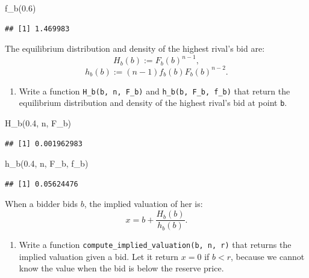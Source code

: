 \documentclass[
]{book}
\newenvironment{Shaded}{\begin{snugshade}}{\end{snugshade}}
\newcommand{\FloatTok}[1]{\textcolor[rgb]{0.00,0.00,0.81}{#1}}
\newcommand{\FunctionTok}[1]{\textcolor[rgb]{0.00,0.00,0.00}{#1}}
\newcommand{\NormalTok}[1]{#1}
\providecommand{\tightlist}{%
  \setlength{\itemsep}{0pt}\setlength{\parskip}{0pt}}
\begin{document}
\begin{Shaded}
\begin{Highlighting}[]
\FunctionTok{f\_b}\NormalTok{(}\FloatTok{0.6}\NormalTok{)}
\end{Highlighting}
\end{Shaded}

\begin{verbatim}
## [1] 1.469983
\end{verbatim}

The equilibrium distribution and density of the highest rival's bid are:
\[
H_b(b) := F_b(b)^{n - 1},
\]
\[
h_b(b) := (n - 1) f_b(b) F_b(b)^{n - 2}.
\]

\begin{enumerate}
\def\labelenumi{\arabic{enumi}.}
\setcounter{enumi}{10}
\tightlist
\item
  Write a function \texttt{H\_b(b,\ n,\ F\_b)} and \texttt{h\_b(b,\ F\_b,\ f\_b)} that return the equilibrium distribution and density of the highest rival's bid at point \texttt{b}.
\end{enumerate}

\begin{Shaded}
\begin{Highlighting}[]
\FunctionTok{H\_b}\NormalTok{(}\FloatTok{0.4}\NormalTok{, n, F\_b)}
\end{Highlighting}
\end{Shaded}

\begin{verbatim}
## [1] 0.001962983
\end{verbatim}

\begin{Shaded}
\begin{Highlighting}[]
\FunctionTok{h\_b}\NormalTok{(}\FloatTok{0.4}\NormalTok{, n, F\_b, f\_b)}
\end{Highlighting}
\end{Shaded}

\begin{verbatim}
## [1] 0.05624476
\end{verbatim}

When a bidder bids \(b\), the implied valuation of her is:
\[
x = b + \frac{H_b(b)}{h_b(b)}.
\]

\begin{enumerate}
\def\labelenumi{\arabic{enumi}.}
\setcounter{enumi}{11}
\tightlist
\item
  Write a function \texttt{compute\_implied\_valuation(b,\ n,\ r)} that returns the implied valuation given a bid. Let it return \(x = 0\) if \(b < r\), because we cannot know the value when the bid is below the reserve price.
\end{enumerate}
\end{document}
